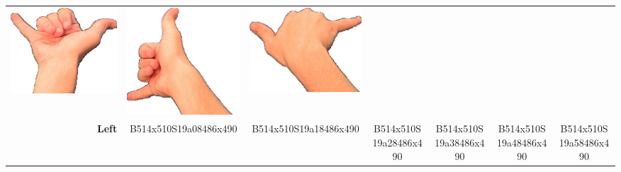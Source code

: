 \documentclass{article}
\begin{document}
\begin{center}
\begin{tabular}{r*{6}{c}}
\includegraphics[scale=0.1]{images/06-07-4.jpg}&
\includegraphics[scale=0.1]{images/06-07-5.jpg}&
\includegraphics[scale=0.1]{images/06-07-6.jpg}\\
\textbf{Left}&
B514x510S19a08486x490&
B514x510S19a18486x490&
B514x510S19a28486x490&
B514x510S19a38486x490&
B514x510S19a48486x490&
B514x510S19a58486x490\\
\end{tabular}
\end{center}
\end{document}
